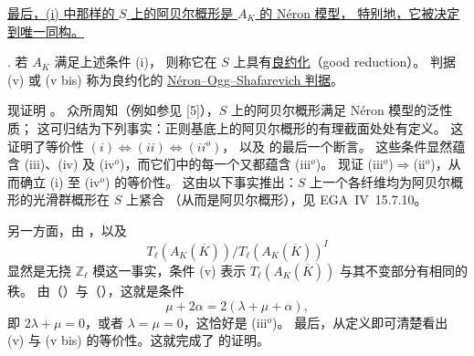 \smallskip
\noindent
\underline{最后，(i) 中那样的 $S$ 上的阿贝尔概形是 $A_K$ 的 N\'eron 模型，
特别地，它被决定到唯一同构。}

\medskip
\noindent
{}. 若 $A_K$ 满足上述条件 (i)，
则称它在 $S$ 上具有\underline{良约化}（good reduction）。
判据 (v) 或 (v bis) 称为良约化的 \underline{N\'eron--Ogg--Shafarevich 判据}。

现证明 。
众所周知（例如参见 [5]），$S$ 上的阿贝尔概形满足 N\'eron 模型的泛性质；
这可归结为下列事实：正则基底上的阿贝尔概形的有理截面处处有定义。
这证明了等价性 $(i)\Longleftrightarrow(ii)\Longleftrightarrow(ii^o)$，
以及  的最后一个断言。
这些条件显然蕴含 (iii)、(iv) 及 (iv$^o$)，而它们中的每一个又都蕴含 (iii$^o$)。
现证 (iii$^o$)$\Longrightarrow$(ii$^o$)，从而确立 (i) 至 (iv$^o$) 的等价性。
这由以下事实推出：$S$ 上一个各纤维均为阿贝尔概形的光滑群概形在 $S$ 上紧合
（从而是阿贝尔概形），见 EGA~IV~15.7.10。

另一方面，由 ，以及
\[
 T_\ell(A_K(\overline K))/T_\ell(A_K(\overline K))^I
\]
显然是无挠 $\mathbb Z_\ell$ 模这一事实，条件 (v) 表示
$T_\ell(A_K(\overline K))$ 与其不变部分有相同的秩。
由（）与（），这就是条件
\[
 \mu+2\alpha=2(\lambda+\mu+\alpha),
\]
即 $2\lambda+\mu=0$，或者 $\lambda=\mu=0$，这恰好是 (iii$^o$)。
最后，从定义即可清楚看出 (v) 与 (v bis) 的等价性。这就完成了  的证明。



